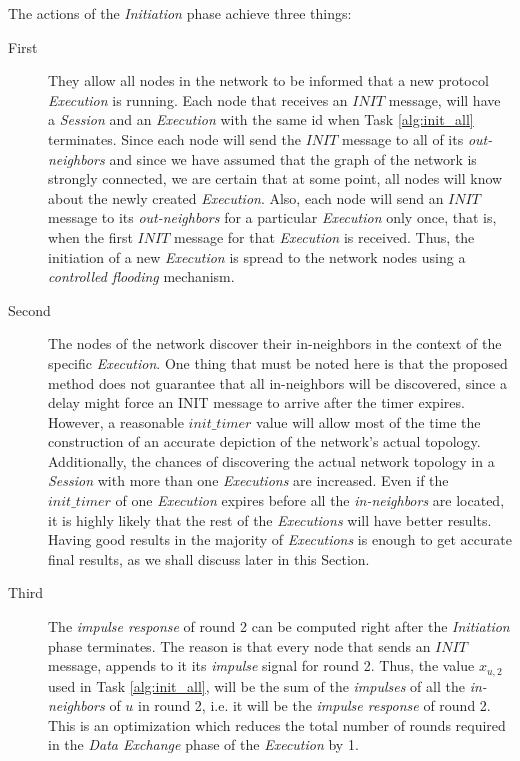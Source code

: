 \documentclass[a4paper,11pt,twoside]{report}
\begin{document}
The actions of the \textit{Initiation} phase achieve three things:
\begin{description}
\item[First] They allow all nodes in the network to be informed that a new protocol \textit{Execution} is running. Each node that receives an $INIT$ message, will have a \textit{Session} and an \textit{Execution} with the same id when Task \ref{alg:init_all} terminates. Since each node will send the $INIT$ message to all of its \textit{out-neighbors} and since we have assumed that the graph of the network is strongly connected, we are certain that at some point, all nodes will know about the newly created \textit{Execution}. Also, each node will send an $INIT$ message to its \textit{out-neighbors} for a particular \textit{Execution} only once, that is, when the first $INIT$ message for that \textit{Execution} is received. Thus, the initiation of a new \textit{Execution} is spread to the network nodes using a \textit{controlled flooding} mechanism.
\item[Second] The nodes of the network discover their in-neighbors in the context of the specific \textit{Execution}. One thing that must be noted here is that the proposed method does not guarantee that all in-neighbors will be discovered, since a delay might force an INIT message to arrive after the timer expires. However, a reasonable $init\_timer$ value will allow most of the time the construction of an accurate depiction of the network's actual topology. Additionally, the chances of discovering the actual network topology in a \textit{Session} with more than one \textit{Executions} are increased. Even if the $init\_timer$ of one \textit{Execution} expires before all the \textit{in-neighbors} are located, it is highly likely that the rest of the \textit{Executions} will have better results. Having good results in the majority of \textit{Executions} is enough to get accurate final results, as we shall discuss later in this Section. 
\item[Third] The \textit{impulse response} of round 2 can be computed right after the \textit{Initiation} phase terminates. The reason is that every node that sends an $INIT$ message, appends to it its \textit{impulse} signal for round 2. Thus, the value $x_{u,2}$ used in Task \ref{alg:init_all}, will be the sum of the \textit{impulses} of all the \textit{in-neighbors} of $u$ in round 2, i.e. it will be the \textit{impulse response} of round 2. This is an optimization which reduces the total number of rounds required in the \textit{Data Exchange} phase of the \textit{Execution} by 1.
\end{description}
\end{document}

